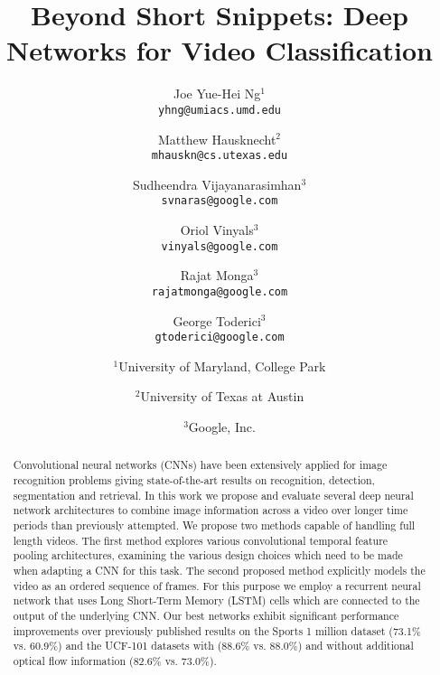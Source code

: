 \documentclass[10pt,twocolumn,letterpaper]{article}
\begin{document}
%
\title{Beyond Short Snippets: Deep Networks for Video Classification}

\author{Joe Yue-Hei Ng$^1$\\
{\tt\small yhng@umiacs.umd.edu} \\
\and
Matthew Hausknecht$^2$ \\
{\tt\small mhauskn@cs.utexas.edu} \\
\and
Sudheendra Vijayanarasimhan$^3$ \\
{\tt\small svnaras@google.com} \\
\and
Oriol Vinyals$^3$ \\
{\tt\small vinyals@google.com} \\
\and
Rajat Monga$^3$ \\
{\tt\small rajatmonga@google.com} \\
\and
George Toderici$^3$ \\
{\tt\small gtoderici@google.com} \\
\and
$^1$University of Maryland, College Park\\
\and
$^2$University of Texas at Austin \\
\and
$^3$Google, Inc. \\
%
}

\maketitle
%
\begin{abstract}
Convolutional neural networks (CNNs) have been extensively applied for image
recognition problems giving state-of-the-art results on recognition, detection,
segmentation and retrieval.  In this work we propose and evaluate several deep
neural network architectures to combine image information across a video over
longer time periods than previously attempted.  We propose two methods capable of
handling full length videos. The first method explores various convolutional
temporal feature pooling architectures, examining the various design choices
which need to be made when adapting a CNN for this task. The second proposed
method explicitly models the video as an ordered sequence of frames. For this
purpose we employ a recurrent neural network that uses Long Short-Term Memory (LSTM)
cells which are connected to the output of the underlying CNN. Our best
networks exhibit significant performance improvements over previously published
results on the Sports 1 million dataset (73.1\% vs.  60.9\%) and the UCF-101
datasets with (88.6\% vs.  88.0\%) and without additional optical flow
information (82.6\% vs. 73.0\%).

%
\end{abstract}
%
\end{document}
